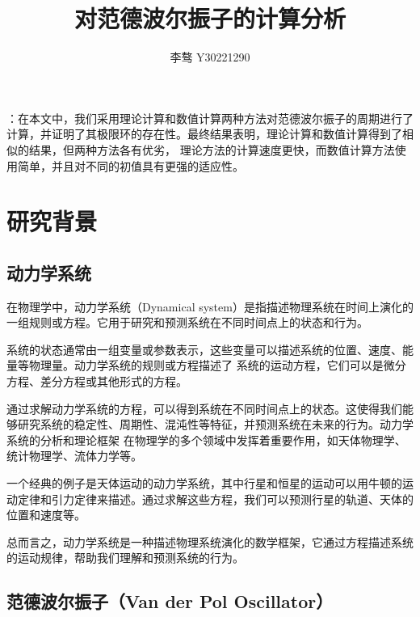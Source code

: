 \documentclass[10.5pt,oneside,a4paper]{article}
\title{\textbf{对范德波尔振子的计算分析}}
\author{\zihao{-4} 李骜 \quad Y30221290}
\date{}
\theoremstyle{mystyle}
\begin{document}
\maketitle
\thispagestyle{fancy}
\vspace{-1cm}
\setlength{\abstitleskip}{-2em}
\setlength{\absleftindent}{0pt}
\setlength{\absrightindent}{0pt}
\begin{onecolabstract}
\songti {}
：在本文中，我们采用理论计算和数值计算两种方法对范德波尔振子的周期进行了计算，并证明了其极限环的存在性。最终结果表明，理论计算和数值计算得到了相似的结果，但两种方法各有优劣，
理论方法的计算速度更快，而数值计算方法使用简单，并且对不同的初值具有更强的适应性。

\vspace{-1em}
\end{onecolabstract}

\vspace{1em}

\section{研究背景}

\subsection{动力学系统}

在物理学中，动力学系统（Dynamical system）是指描述物理系统在时间上演化的一组规则或方程。它用于研究和预测系统在不同时间点上的状态和行为。

系统的状态通常由一组变量或参数表示，这些变量可以描述系统的位置、速度、能量等物理量。动力学系统的规则或方程描述了
系统的运动方程，它们可以是微分方程、差分方程或其他形式的方程。

通过求解动力学系统的方程，可以得到系统在不同时间点上的状态。这使得我们能够研究系统的稳定性、周期性、混沌性等特征，并预测系统在未来的行为。动力学系统的分析和理论框架
在物理学的多个领域中发挥着重要作用，如天体物理学、统计物理学、流体力学等。

一个经典的例子是天体运动的动力学系统，其中行星和恒星的运动可以用牛顿的运动定律和引力定律来描述。通过求解这些方程，我们可以预测行星的轨道、天体的位置和速度等。

总而言之，动力学系统是一种描述物理系统演化的数学框架，它通过方程描述系统的运动规律，帮助我们理解和预测系统的行为。

\subsection{范德波尔振子（Van der Pol Oscillator）}
\end{document}
